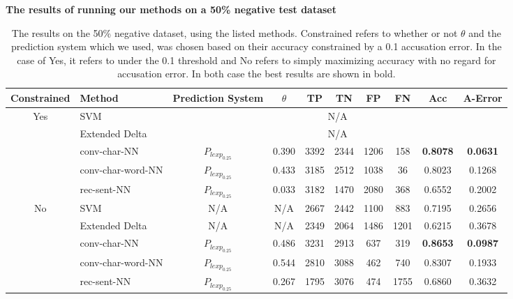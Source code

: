 \begin{table}[]
\centering
\textbf{The results of running our methods on a 50\% negative test dataset}\par\medskip
\begin{adjustbox}{center}
\begin{tabular}{|c|l|c|c|c|c|c|c|c|c|}
\hline
Constrained                & Method                  & Prediction System            & $\theta$ & TP  & TN  & FP  & FN  & Acc             & A-Error         \\ \hline
\multirow{5}{*}{Yes} & SVM                     & \multicolumn{8}{c|}{N/A}                                                                     \\ \cline{2-10} 
                     & Extended Delta          & \multicolumn{8}{c|}{N/A}                                                                     \\ \cline{2-10} 
                     & \gls{conv-char-NN}      & $P_{lexp_{0.25}}$ & 0.390    & 3392 & 2344 & 1206 & 158  & \textbf{0.8078} & \textbf{0.0631} \\ \cline{2-10} 
                     & \gls{conv-char-word-NN} & $P_{lexp_{0.25}}$ & 0.433    & 3185 & 2512 & 1038 & 36   & 0.8023          & 0.1268          \\ \cline{2-10} 
                     & \gls{rec-sent-NN}       & $P_{lexp_{0.25}}$ & 0.033    & 3182 & 1470 & 2080 & 368  & 0.6552          & 0.2002          \\ \hline\hline
\multirow{5}{*}{No}  & SVM                     & N/A               & N/A      & 2667 & 2442 & 1100 & 883  & 0.7195          & 0.2656          \\ \cline{2-10} 
                     & Extended Delta          & N/A               & N/A      & 2349 & 2064 & 1486 & 1201 & 0.6215          & 0.3678          \\ \cline{2-10} 
                     & \gls{conv-char-NN}      & $P_{lexp_{0.25}}$ & 0.486    & 3231 & 2913 & 637  & 319  & \textbf{0.8653} & \textbf{0.0987} \\ \cline{2-10} 
                     & \gls{conv-char-word-NN} & $P_{lexp_{0.25}}$ & 0.544    & 2810 & 3088 & 462  & 740  & 0.8307          & 0.1933          \\ \cline{2-10} 
                     & \gls{rec-sent-NN}       & $P_{lexp_{0.25}}$ & 0.267    & 1795 & 3076 & 474  & 1755 & 0.6860          & 0.3632          \\ \hline
\end{tabular}
\end{adjustbox}
\caption{The results on the 50\% negative dataset, using the listed methods.
Constrained refers to whether or not $\theta$ and the prediction system which we
used, was chosen based on their accuracy constrained by a 0.1 accusation error.
In the case of Yes, it refers to under the 0.1 threshold and No refers to simply
maximizing accuracy with no regard for accusation error. In both case
the best results are shown in bold.}
\label{tab:50_results}
\end{table}


